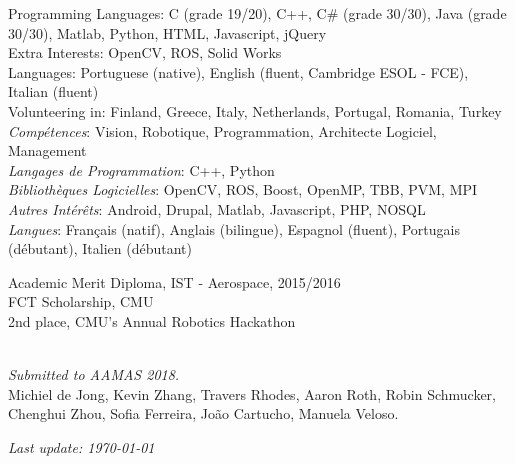 \documentclass{article}
\begin{document}
\begin{llist}
{}

{
Programming Languages: C (grade 19/20), C++, C\# (grade 30/30), Java (grade 30/30), Matlab, Python, HTML, Javascript, jQuery\\
Extra Interests: OpenCV, ROS, Solid Works\\

Languages: Portuguese (native), English (fluent, Cambridge ESOL - FCE), Italian (fluent)\\
Volunteering in: Finland, Greece, Italy, Netherlands, Portugal, Romania, Turkey
}
{
{\em Comp\'{e}tences}: Vision, Robotique, Programmation, Architecte Logiciel, Management\\
{\em Langages de Programmation}: C++, Python\\
{\em Biblioth\`{e}ques Logicielles}: OpenCV, ROS, Boost, OpenMP, TBB, PVM, MPI \\
{\em Autres Int\'{e}r\^{e}ts}: Android, Drupal, Matlab, Javascript, PHP, NOSQL \\
{\em Langues}: Fran\c{c}ais (natif), Anglais (bilingue), Espagnol (fluent), Portugais (d\'{e}butant), Italien
(d\'{e}butant)
}

\textendash Academic Merit Diploma, IST - Aerospace, 2015/2016\\
\textendash FCT Scholarship, CMU\\
\textendash 2nd place, CMU's Annual Robotics Hackathon

\vspace{-0.3cm}
\\
{\em Submitted to AAMAS 2018.}\\
Michiel de Jong, Kevin Zhang, Travers Rhodes, Aaron Roth, Robin Schmucker,
Chenghui Zhou, Sofia Ferreira, Jo\~{a}o Cartucho, Manuela Veloso.




\end{llist}

{\em Last update: \today}
\end{document}
